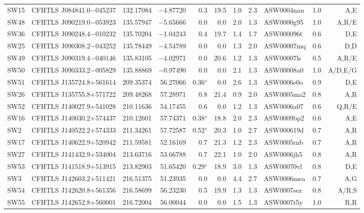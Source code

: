 \documentclass[useAMS,usenatbib,a4paper]{mn2e}
\begin{document}
\begin{center}
\begin{longtable}{llrrrrrrlrr}
SW15 & CFHTLS J084841.0$-$045237 & 132.17084 &  $-$4.87720 &  0.3 & 19.5 &  1.0 &  2.3 & ASW0004nan &  1.0 &  A,E   \\
SW48 & CFHTLS J090219.0$-$053923 & 135.57947 &  $-$5.65666 &  0.0 &  0.0 &  2.0 &  1.3 & ASW0000g95 &  1.0 &  A,R/E   \\
SW36 & CFHTLS J090248.4$-$010232 & 135.70204 &  $-$1.04243 &  0.4 & 19.7 &  1.4 &  1.7 & ASW000096t &  0.6 &  D,E   \\
SW25 & CFHTLS J090308.2$-$043252 & 135.78449 &  $-$4.54789 &  0.0 &  0.0 &  1.3 &  2.0 & ASW00007mq &  0.6 &  D,D   \\
SW49 & CFHTLS J090319.4$-$040146 & 135.83105 &  $-$4.02971 &  0.0 & 20.6 &  1.2 &  1.3 & ASW00007ls &  0.5 &  A,R/E   \\
SW50 & CFHTLS J090333.2$-$005829 & 135.88869 &  $-$0.97490 &  0.0 &  0.0 &  2.1 &  1.3 & ASW00008a0 &  1.0 &  A/D,E/G   \\
SW51 & CFHTLS J135724.8+561614 & 209.35374 &  56.27066 &  0.36$^s$ &  0.0 &  2.6 &  1.3 & ASW0006e0o &  0.9 &  D,E   \\
SW26 & CFHTLS J135755.8+571722 & 209.48268 &  57.28971 &  0.8 & 21.4 &  0.9 &  2.0 & ASW0005ma2 &  0.8 &  A,R   \\
SW52 & CFHTLS J140027.9+541028 & 210.11636 &  54.17455 &  0.6 &  0.0 &  1.2 &  1.3 & ASW0006a07 &  0.6 &  Q,R/E   \\
SW16 & CFHTLS J140030.2+574437 & 210.12601 &  57.74371 &  0.38$^s$ & 18.8 &  2.0 &  2.3 & ASW0009bp2 &  0.6 &  A,E   \\
SW2 & CFHTLS J140522.2+574333 & 211.34261 &  57.72587 &  0.52$^s$ & 20.3 &  1.0 &  2.7 & ASW000619d &  0.7 &  A,R   \\
SW17 & CFHTLS J140622.9+520942 & 211.59581 &  52.16169 &  0.7 & 21.3 &  1.2 &  2.3 & ASW0005rnb &  0.7 &  A,R   \\
SW27 & CFHTLS J141432.9+534004 & 213.63716 &  53.66788 &  0.7 & 22.1 &  1.0 &  2.0 & ASW0006jh5 &  0.8 &  A,R   \\
SW53 & CFHTLS J141518.9+513915 & 213.82903 &  51.65420 &  0.29$^s$ & 18.9 &  3.0 &  1.3 & ASW00070vl &  0.8 &  D,E   \\
SW3 & CFHTLS J142603.2+511421 & 216.51375 &  51.23935 &  0.0 &  0.0 &  4.4 &  2.7 & ASW0006mea &  0.7 &  A,G   \\
SW54 & CFHTLS J142620.8+561356 & 216.58699 &  56.23230 &  0.5 & 19.9 &  1.3 &  1.3 & ASW0007sez &  0.8 &  A/R,S   \\
SW55 & CFHTLS J142652.8+560001 & 216.72004 &  56.00044 &  0.0 &  0.0 &  1.5 &  1.3 & ASW0007t5y &  1.0 &  R,R   \\

\end{longtable}
\end{center}
\end{document}
